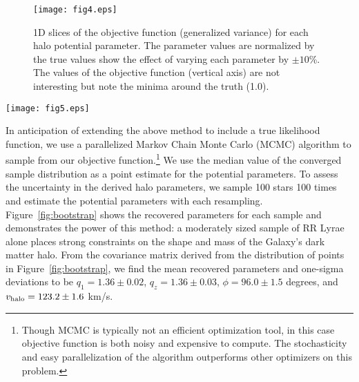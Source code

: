 \documentclass{emulateapj}
\begin{document}
\begin{figure}[h]
\begin{center}
\texttt{[image: fig4.eps]}
\caption{ 1D slices of the objective function (generalized variance) for each halo potential parameter. The parameter values are normalized by the true values show the effect of varying each parameter by $\pm10$\%. The values of the objective function (vertical axis) are not interesting but note the minima around the truth (1.0).}\label{fig:objective}
\end{center}
\end{figure}

\begin{figure*}[ht!]
\centering\texttt{[image: fig5.eps]}
\caption{ Blue points show the ``best-fit'' parameters resulting from each resample of 100 stars from the Sgr stream particle density shown in Figure~\ref{fig:lm10}. Green (vertical and horizontal) lines show the true values of the parameters. Grey ellipses show one- and two-sigma margins, assuming the points are normally distributed. }\label{fig:bootstrap}
\end{figure*}	

In anticipation of extending the above method to include a true
likelihood function, we use a parallelized Markov Chain Monte Carlo
(MCMC) algorithm \citep{foremanmackey2013} to sample from our
objective function.\footnote{Though MCMC is typically not an efficient
  optimization tool, in this case objective function is both noisy and
  expensive to compute. The stochasticity and easy parallelization of
  the algorithm outperforms other optimizers on this problem.}
We use the median value of the converged sample distribution as a
point estimate for the potential parameters. To assess the uncertainty
in the derived halo parameters, we sample 100 stars
100 times and estimate the potential parameters with each
resampling. Figure~\ref{fig:bootstrap} shows the recovered parameters
for each sample and demonstrates the power of this method:
a moderately sized sample of RR Lyrae
alone places strong constraints on the shape and mass of the
Galaxy's dark matter halo. From the covariance matrix derived from the 
distribution of points in Figure~\ref{fig:bootstrap}, we find the mean 
recovered parameters and one-sigma deviations to be 
$q_1 = 1.36 \pm 0.02$, $q_z = 1.36 \pm 0.03$, $\phi = 96.0 \pm 1.5$ degrees,
and $v_{\rm halo} = 123.2 \pm 1.6$ km/s.
\end{document}
